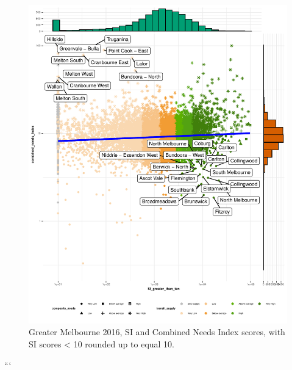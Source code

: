 \documentclass[preprint, 3p,
authoryear]{elsarticle} %
\begin{document}
\begin{figure}
\centering
\includegraphics{ReynoldsCurrieQu2024_files/figure-latex/Greater_Melbourne_2016_needs_gap_scatterplot_figure-1.pdf}
\caption{Greater Melbourne 2016, SI and Combined Needs Index scores,
with SI scores \textless{} 10 rounded up to equal 10.}
\end{figure}

```
\end{document}
